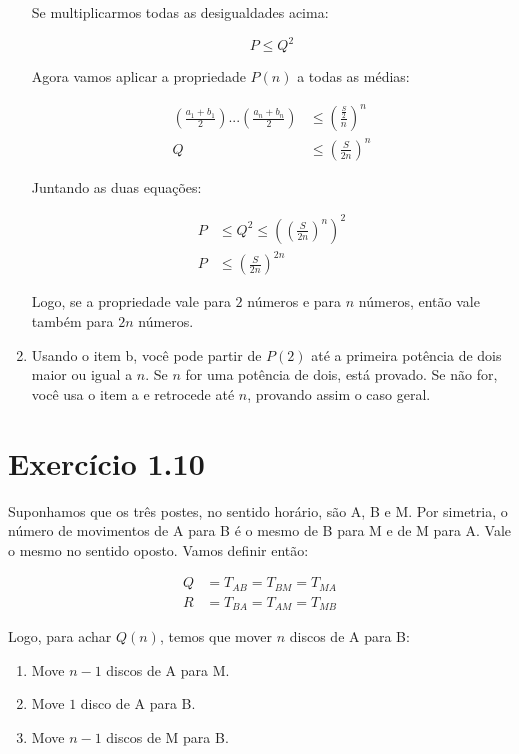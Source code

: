 \documentclass[10pt]{book}
\begin{document}
\begin{enumerate}
  Se multiplicarmos todas as desigualdades acima: 

\[ P\leq Q^2 \]

Agora vamos aplicar a propriedade $P(n)$ a todas as médias: 

\begin{align*}
 \left(\frac{a_1+b_1}{2}\right)...\left(\frac{a_n+b_n}{2}\right)&\leq\left( \frac{\frac{S}{2}}{n} \right)^n \\
  Q&\leq\left(\frac{S}{2n}\right)^n 
\end{align*}

Juntando as duas equações: 

\begin{align*}
  P&\leq Q^2 \leq \left( \left(\frac{S}{2n}\right)^n \right)^2 \\
  P&\leq\left(\frac{S}{2n}\right)^{2n}  
\end{align*}

  Logo, se a propriedade vale para $2$ números e para $n$ números, então vale também para $2n$ números. 

\item Usando o item b, você pode partir de $P(2)$ até a primeira potência de dois maior ou igual a $n$. Se $n$ for uma potência de dois, está provado. Se não for, você usa o item a e retrocede até $n$, provando assim o caso geral. 
\end{enumerate}

\section{  Exercício 1.10 }

Suponhamos que os três postes, no sentido horário, são A, B e M. Por simetria, o número de movimentos de A para B é o mesmo de B para M e de M para A. Vale o mesmo no sentido oposto. Vamos definir então: 

\begin{align*}
 Q&=T_{AB}=T_{BM}=T_{MA}  \\
 R&=T_{BA}=T_{AM}=T_{MB} 
\end{align*}

 Logo, para achar $Q(n)$, temos que mover $n$ discos de A para B: 

\begin{enumerate}
  \item Move $n-1$ discos de A para M. 
  \item Move $1$ disco de A para B. 
  \item Move $n-1$ discos de M para B. 
\end{enumerate}
\end{document}
